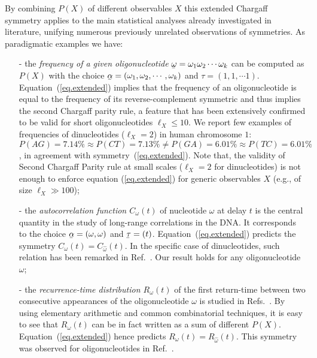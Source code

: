 \documentclass[fleqn,10pt]{wlscirep}
\begin{document}
By combining $P(X)$ of different observables $X$ this extended Chargaff symmetry applies to the main statistical analyses already investigated in literature, unifying numerous previously unrelated observations of symmetries. As paradigmatic examples we have:
\begin{itemize} 
\item[-] the \emph{frequency of a given oligonucleotide} $\underaccent{\bar}{\omega}=\omega_1 \omega_2 \cdots \omega_k$  can be computed as $P(X)$ with the choice $\underaccent{\bar}{\alpha}=(\omega_1, \omega_2, \cdots, \omega_k)$ and $\tau=(1,1,\cdots 1)$. Equation~(\ref{eq.extended}) implies that  the frequency of an oligonucleotide is equal to the frequency of its reverse-complement symmetric  and thus implies the second Chargaff parity rule, a feature that has been extensively confirmed\cite{PHB02, KFCHZZL09, ABGRPF13} to be valid for short oligonucleotides $\ell_X \le 10$. We report few examples of frequencies of dinucleotides ($\ell_X = 2$) in human chromosome $1$:  
$P(AG)= 7.14\% \approx  P(CT)= 7.13\% \ne P(GA)= 6.01 \% \approx P(TC)= 6.01\%$, in agreement with symmetry~(\ref{eq.extended}). Note that, the validity of Second Chargaff Parity rule at small scales ($\ell_X=2$ for dinucleotides) is not enough to enforce  equation (\ref{eq.extended}) for generic observables $X$ (e.g., of size $\ell_X \gg 100$);
\item[-]
the \emph{autocorrelation function $C_{\omega}(t)$} of nucleotide $\omega$ at delay $t$ is the central quantity in the study of long-range correlations in the DNA. It corresponds to the choice $\underaccent{\bar}{\alpha}=(\omega, \omega)$ and $\underaccent{\bar}{\tau}=(t)$.  Equation~(\ref{eq.extended}) predicts the symmetry $C_{\omega}(t)=C_{\hat{\omega}}(t)$.  In the specific  case of dinucleotides, such relation has been  remarked in Ref.~\cite{Li97}. Our result holds for any oligonucleotide $\omega$;
\item [-]
  the \emph{recurrence-time distribution $R_{\omega}(t)$ }of  the first return-time  between two consecutive appearances of the oligonucleotide $\omega$ is studied in Refs.~\cite{ABPGF09, FS12}. By using elementary arithmetic and common combinatorial techniques, it is easy to see that $R_{\omega}(t)$  can be  in fact written as a sum of different $P(X)$.  Equation~(\ref{eq.extended}) hence predicts $R_\omega(t) = R_{\hat{\omega}}(t)$. 
  This symmetry was observed for  oligonucleotides in Ref.~\cite{TPSRBFA17}.
\end{itemize} 
\end{document}

